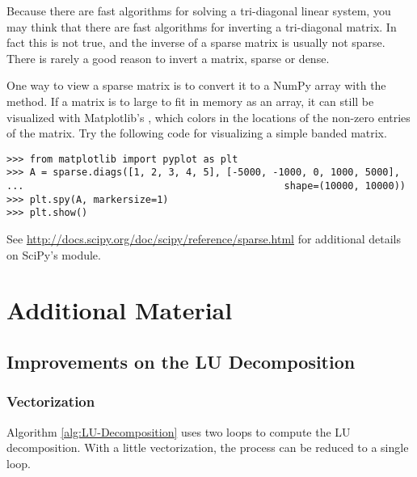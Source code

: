 \begin{warn} %
Because there are fast algorithms for solving a tri-diagonal linear system, you may think that there are fast algorithms for inverting a tri-diagonal matrix.
In fact this is not true, and the inverse of a sparse matrix is usually not sparse.
There is rarely a good reason to invert a matrix, sparse or dense.
\end{warn}

\begin{info} %
One way to view a sparse matrix is to convert it to a NumPy array with the  method.
If a matrix is to large to fit in memory as an array, it can still be visualized with Matplotlib's , which colors in the locations of the non-zero entries of the matrix.
Try the following code for visualizing a simple banded matrix.

\begin{lstlisting}
>>> from matplotlib import pyplot as plt
>>> A = sparse.diags([1, 2, 3, 4, 5], [-5000, -1000, 0, 1000, 5000],
...                                             shape=(10000, 10000))
>>> plt.spy(A, markersize=1)
>>> plt.show()
\end{lstlisting}
\end{info}

See \url{http://docs.scipy.org/doc/scipy/reference/sparse.html} for additional details on SciPy's  module.

\newpage

\section*{Additional Material} %

\subsection*{Improvements on the LU Decomposition} %

\subsubsection*{Vectorization} %

Algorithm \ref{alg:LU-Decomposition} uses two loops to compute the LU decomposition.
With a little vectorization, the process can be reduced to a single loop.

